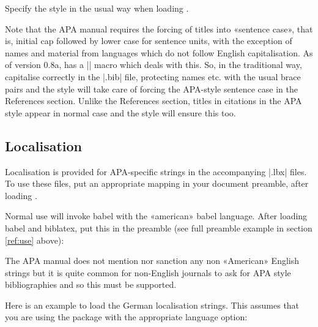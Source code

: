 \documentclass{ltxdockit}
\begin{document}
\noindent Specify the style in the usual way when loading . 

\begin{ltxcode}
\usepackage[american]{babel}
\usepackage{csquotes}
\usepackage[style=apa]{biblatex}
\end{ltxcode}

\noindent Note that the APA manual requires the forcing of titles into
«sentence case», that is, initial cap followed by lower case for sentence
units, with the exception of names and material from languages which do not
follow English capitalisation. As of version 0.8a,  has a
|\MakeSentenceCase| macro which deals with this. So, in the traditional
\bibtex way, capitalise correctly in the |.bib| file, protecting names etc.
with the usual brace pairs and the style will take care of forcing the
APA-style sentence case in the References section. Unlike the References
section, titles in citations in the APA style appear in normal case and the
style will ensure this too.

\subsection{Localisation}

Localisation is provided for APA-specific strings in the accompanying
|.lbx| files. To use these files, put an appropriate mapping in your
document preamble, after loading .

Normal use will invoke babel with the «american» babel language. After
loading babel and biblatex, put this in the preamble (see full preamble
example in section \ref{ref:use} above):

\begin{ltxcode}
\end{ltxcode}

The APA manual does not mention nor sanction any non «American» English
strings but it is quite common for non-English journals to ask for APA style
bibliographies and so this must be supported.

Here is an example to load the German localisation strings. This assumes
that you are using the  package with the appropriate language
option:

\begin{ltxcode}
\end{ltxcode}
\end{document}
